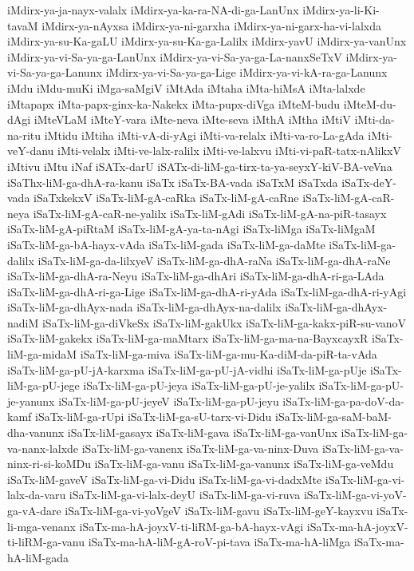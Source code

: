 {iMdirx-ya-ja-nayx-valalx
iMdirx-ya-ka-ra-NA-di-ga-LanUnx
iMdirx-ya-li-Ki-tavaM
iMdirx-ya-nAyxsa
iMdirx-ya-ni-garxha
iMdirx-ya-ni-garx-ha-vi-lalxda
iMdirx-ya-su-Ka-gaLU
iMdirx-ya-su-Ka-ga-Lalilx
iMdirx-yavU
iMdirx-ya-vanUnx
iMdirx-ya-vi-Sa-ya-ga-LanUnx
iMdirx-ya-vi-Sa-ya-ga-La-nanxSeTxV
iMdirx-ya-vi-Sa-ya-ga-Lanunx
iMdirx-ya-vi-Sa-ya-ga-Lige
iMdirx-ya-vi-kA-ra-ga-Lanunx
iMdu
iMdu-muKi
iMga-saMgiV
iMtAda
iMtaha
iMta-hiMsA
iMta-lalxde
iMtapapx
iMta-papx-ginx-ka-Nakekx
iMta-pupx-diVga
iMteM-budu
iMteM-du-dAgi
iMteVLaM
iMteY-vara
iMte-neva
iMte-seva
iMthA
iMtha
iMtiV
iMti-da-na-ritu
iMtidu
iMtiha
iMti-vA-di-yAgi
iMti-va-relalx
iMti-va-ro-La-gAda
iMti-veY-danu
iMti-velalx
iMti-ve-lalx-ralilx
iMti-ve-lalxvu
iMti-vi-paR-tatx-nAlikxV
iMtivu
iMtu
iNaf
iSATx-darU
iSATx-di-liM-ga-tirx-ta-ya-seyxY-kiV-BA-veVna
iSaThx-liM-ga-dhA-ra-kanu
iSaTx
iSaTx-BA-vada
iSaTxM
iSaTxda
iSaTx-deY-vada
iSaTxkekxV
iSaTx-liM-gA-caRka
iSaTx-liM-gA-caRne
iSaTx-liM-gA-caR-neya
iSaTx-liM-gA-caR-ne-yalilx
iSaTx-liM-gAdi
iSaTx-liM-gA-na-piR-tasayx
iSaTx-liM-gA-piRtaM
iSaTx-liM-gA-ya-ta-nAgi
iSaTx-liMga
iSaTx-liMgaM
iSaTx-liM-ga-bA-hayx-vAda
iSaTx-liM-gada
iSaTx-liM-ga-daMte
iSaTx-liM-ga-dalilx
iSaTx-liM-ga-da-lilxyeV
iSaTx-liM-ga-dhA-raNa
iSaTx-liM-ga-dhA-raNe
iSaTx-liM-ga-dhA-ra-Neyu
iSaTx-liM-ga-dhAri
iSaTx-liM-ga-dhA-ri-ga-LAda
iSaTx-liM-ga-dhA-ri-ga-Lige
iSaTx-liM-ga-dhA-ri-yAda
iSaTx-liM-ga-dhA-ri-yAgi
iSaTx-liM-ga-dhAyx-nada
iSaTx-liM-ga-dhAyx-na-dalilx
iSaTx-liM-ga-dhAyx-nadiM
iSaTx-liM-ga-diVkeSx
iSaTx-liM-gakUkx
iSaTx-liM-ga-kakx-piR-su-vanoV
iSaTx-liM-gakekx
iSaTx-liM-ga-maMtarx
iSaTx-liM-ga-ma-na-BayxcayxR
iSaTx-liM-ga-midaM
iSaTx-liM-ga-miva
iSaTx-liM-ga-mu-Ka-diM-da-piR-ta-vAda
iSaTx-liM-ga-pU-jA-karxma
iSaTx-liM-ga-pU-jA-vidhi
iSaTx-liM-ga-pUje
iSaTx-liM-ga-pU-jege
iSaTx-liM-ga-pU-jeya
iSaTx-liM-ga-pU-je-yalilx
iSaTx-liM-ga-pU-je-yanunx
iSaTx-liM-ga-pU-jeyeV
iSaTx-liM-ga-pU-jeyu
iSaTx-liM-ga-pa-doV-da-kamf
iSaTx-liM-ga-rUpi
iSaTx-liM-ga-sU-tarx-vi-Didu
iSaTx-liM-ga-saM-baM-dha-vanunx
iSaTx-liM-gasayx
iSaTx-liM-gava
iSaTx-liM-ga-vanUnx
iSaTx-liM-ga-va-nanx-lalxde
iSaTx-liM-ga-vanenx
iSaTx-liM-ga-va-ninx-Duva
iSaTx-liM-ga-va-ninx-ri-si-koMDu
iSaTx-liM-ga-vanu
iSaTx-liM-ga-vanunx
iSaTx-liM-ga-veMdu
iSaTx-liM-gaveV
iSaTx-liM-ga-vi-Didu
iSaTx-liM-ga-vi-dadxMte
iSaTx-liM-ga-vi-lalx-da-varu
iSaTx-liM-ga-vi-lalx-deyU
iSaTx-liM-ga-vi-ruva
iSaTx-liM-ga-vi-yoV-ga-vA-dare
iSaTx-liM-ga-vi-yoVgeV
iSaTx-liM-gavu
iSaTx-liM-geY-kayxvu
iSaTx-li-mga-venanx
iSaTx-ma-hA-joyxV-ti-liRM-ga-bA-hayx-vAgi
iSaTx-ma-hA-joyxV-ti-liRM-ga-vanu
iSaTx-ma-hA-liM-gA-roV-pi-tava
iSaTx-ma-hA-liMga
iSaTx-ma-hA-liM-gada
}
